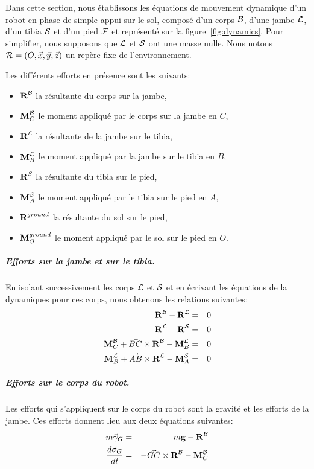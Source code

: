Dans cette section, nous établissons les équations de mouvement
dynamique d'un robot en phase de simple appui sur le sol, composé d'un
corps ${\cal B}$, d'une jambe ${\cal L}$, d'un tibia ${\cal S}$ et
d'un pied ${\cal F}$ et représenté sur la figure~\ref{fig:dynamics}.
Pour simplifier, nous supposons que ${\cal L}$ et ${\cal S}$ ont une masse
nulle. Nous notons ${\cal R}=(O,\vec{x},\vec{y},\vec{z})$ un repère
fixe de l'environnement.

Les différents efforts en présence sont les suivants:
\begin{itemize}
  \item $\textbf{R}^{\cal B}$ la résultante du corps sur la jambe,
  \item $\textbf{M}^{\cal B}_C$ le moment  appliqué par le
    corps sur la jambe en $C$,
  \item $\textbf{R}^{\cal L}$ la résultante de la jambe sur le tibia,
  \item $\textbf{M}^{\cal L}_B$ le moment  appliqué par la
    jambe sur le tibia en $B$,
  \item $\textbf{R}^{\cal S}$ la résultante du tibia sur le pied,
  \item $\textbf{M}^{\cal S}_A$ le moment  appliqué par le
    tibia sur le pied en $A$,
  \item $\textbf{R}^{ground}$ la résultante du sol sur le pied,
  \item $\textbf{M}^{ground}_O$ le moment appliqué par le sol sur le pied en $O$.
\end{itemize}

\subparagraph{Efforts sur la jambe et sur le tibia.}
En isolant successivement les corps ${\cal L}$ et ${\cal S}$ et en
écrivant les équations de la dynamiques pour ces corps, nous obtenons
les relations suivantes:
\begin{eqnarray}
  \label{eq:resultante-L}
  \textbf{R}^{\cal B} - \textbf{R}^{\cal L} &=& 0 \\
  \label{eq:resultante-S}
  \textbf{R}^{\cal L} - \textbf{R}^{\cal S} &=& 0 \\
  \label{eq:moment-L}
  \textbf{M}^{\cal B}_C + \vec{BC}\times \textbf{R}^{\cal B} -
  \textbf{M}^{\cal L}_B &=& 0 \\
  \label{eq:moment-S}
  \textbf{M}^{\cal L}_B + \vec{AB}\times \textbf{R}^{\cal L} -
  \textbf{M}^{\cal S}_A &=& 0
\end{eqnarray}

\subparagraph{Efforts sur le corps du robot.}
Les efforts qui s'appliquent sur le corps du robot sont la gravité et
les efforts de la jambe. Ces efforts donnent lieu aux deux équations
suivantes:
\begin{eqnarray}\label{eq:resultante-B}
m \vec{\gamma}_G &=& m\textbf{g} - \textbf{R}^{\cal B} \\
\label{eq:moment-B}
\frac{d\vec{\sigma}_G}{dt} &=& -\vec{GC}\times \textbf{R}^{\cal B} - \textbf{M}^{\cal B}_C
\end{eqnarray}

